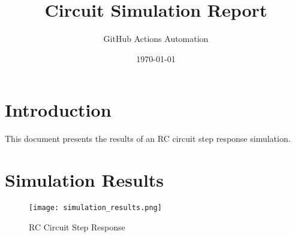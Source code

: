 \documentclass{article}
\begin{document}
\title{Circuit Simulation Report}
\author{GitHub Actions Automation}
\date{\today}
\maketitle

\section{Introduction}
This document presents the results of an RC circuit step response simulation.

\section{Simulation Results}
\begin{figure}[h]
    \centering
    \texttt{[image: simulation\_results.png]}
    \caption{RC Circuit Step Response}
\end{figure}
\end{document}
